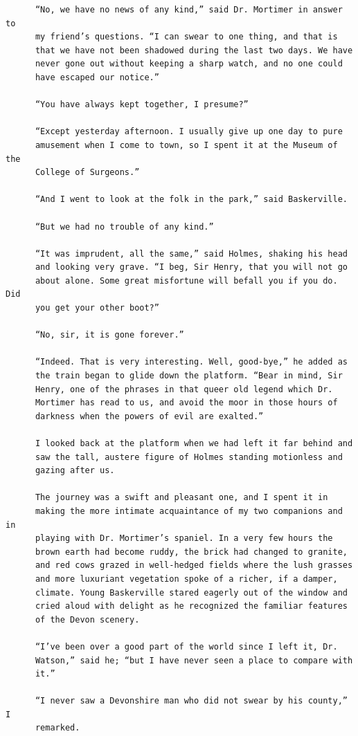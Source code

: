 \documentclass{article}
\begin{document}
\begin{verbatim}
      “No, we have no news of any kind,” said Dr. Mortimer in answer to
      my friend’s questions. “I can swear to one thing, and that is
      that we have not been shadowed during the last two days. We have
      never gone out without keeping a sharp watch, and no one could
      have escaped our notice.”

      “You have always kept together, I presume?”

      “Except yesterday afternoon. I usually give up one day to pure
      amusement when I come to town, so I spent it at the Museum of the
      College of Surgeons.”

      “And I went to look at the folk in the park,” said Baskerville.

      “But we had no trouble of any kind.”

      “It was imprudent, all the same,” said Holmes, shaking his head
      and looking very grave. “I beg, Sir Henry, that you will not go
      about alone. Some great misfortune will befall you if you do. Did
      you get your other boot?”

      “No, sir, it is gone forever.”

      “Indeed. That is very interesting. Well, good-bye,” he added as
      the train began to glide down the platform. “Bear in mind, Sir
      Henry, one of the phrases in that queer old legend which Dr.
      Mortimer has read to us, and avoid the moor in those hours of
      darkness when the powers of evil are exalted.”

      I looked back at the platform when we had left it far behind and
      saw the tall, austere figure of Holmes standing motionless and
      gazing after us.

      The journey was a swift and pleasant one, and I spent it in
      making the more intimate acquaintance of my two companions and in
      playing with Dr. Mortimer’s spaniel. In a very few hours the
      brown earth had become ruddy, the brick had changed to granite,
      and red cows grazed in well-hedged fields where the lush grasses
      and more luxuriant vegetation spoke of a richer, if a damper,
      climate. Young Baskerville stared eagerly out of the window and
      cried aloud with delight as he recognized the familiar features
      of the Devon scenery.

      “I’ve been over a good part of the world since I left it, Dr.
      Watson,” said he; “but I have never seen a place to compare with
      it.”

      “I never saw a Devonshire man who did not swear by his county,” I
      remarked.


\end{verbatim}
\end{document}
